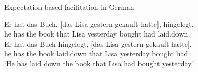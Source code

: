 \documentclass[
]{article}
\begin{document}
\begin{exe} \ex Expectation-based facilitation in German \label{ex-german}
\begin{xlist}
\ex \gll Er hat das Buch, [das Lisa gestern gekauft hatte], hingelegt.\\
         he has the book that Lisa yesterday bought had laid.down\\
\ex  \gll Er hat das Buch hingelegt, [das Lisa gestern gekauft hatte].\\
        he has the book laid.down that Lisa yesterday bought had\\
       \glt ‘He has laid down the book that Lisa had bought yesterday.’ 
\end{xlist}
\end{exe}

\printbibliography[title=References]
\end{document}
